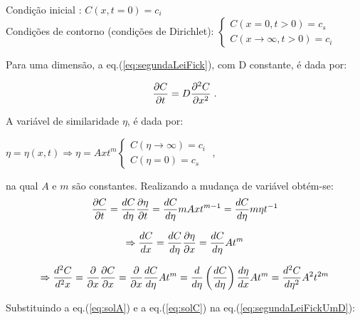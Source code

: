 \documentclass[]{politex}
\begin{document}
\begin{center} 
	Condição inicial : $C(x,t=0) = c_i$  \\
	Condições de contorno (condições de Dirichlet): 
	\begin{math}
  		\left\{
    	\begin{array}{l}
      		C(x=0,t>0) = c_s\\
      		C(x\rightarrow \infty, t>0) = c_i
    	\end{array}
  		\right.
	\end{math}
\end{center}

Para uma dimensão, a eq.(\ref{eq:segundaLeiFick}), com D constante, é dada por:

\begin{equation} \label{eq:segundaLeiFickUmD}
 \pdv{C}{t} = D\pdv[2]{C}{x} \; .
\end{equation}

A variável de similaridade $\eta$, é dada por:

\begin{center}
	\begin{math}
		\eta = \eta(x,t) \Rightarrow \eta = Axt^m
		\left\{
    		\begin{array}{l}
      			C(\eta\rightarrow \infty) = c_i\\
      			C(\eta=0) = c_s
    		\end{array}
		\right.
		\; ,
	\end{math}
\end{center}

na qual $A$ e $m$ são constantes.
Realizando a mudança de variável obtém-se:
\begin{equation} \label{eq:solA}
 \pdv{C}{t} = \frac{dC}{d\eta}\pdv{\eta}{t} = \frac{dC}{d\eta}mAxt^{m-1} = \frac{dC}{d\eta}m\eta t^{-1}
\end{equation}

\begin{equation} \label{eq:solB}
\Rightarrow \frac{dC}{dx} = \frac{dC}{d\eta}\pdv{\eta}{x} = \frac{dC}{d\eta}At^m
\end{equation}

\begin{equation} \label{eq:solC}
\Rightarrow \frac{d^2C}{d^2x} = \pdv{}{x}\pdv{C}{x} = \pdv{ }{x} \frac{dC}{d\eta}At^m = \frac{d}{d\eta}\left(\frac{dC}{d\eta}\right)\frac{d\eta}{dx}At^m = \frac{d^2C}{d\eta ^2}A^2t^{2m}
\end{equation}

Substituindo a eq.(\ref{eq:solA}) e a eq.(\ref{eq:solC}) na eq.(\ref{eq:segundaLeiFickUmD}):
\end{document}
